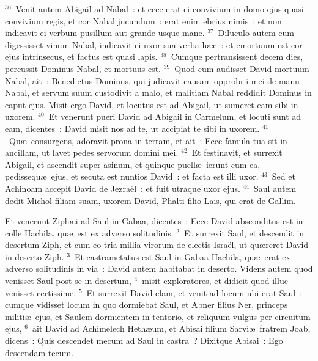 ${}^{36}$~Venit autem Abigail ad Nabal~: et ecce erat ei convivium in domo ejus quasi convivium regis, et cor Nabal jucundum~: erat enim ebrius nimis~: et non indicavit ei verbum pusillum aut grande usque mane.
${}^{37}$~Diluculo autem cum digessisset vinum Nabal, indicavit ei uxor sua verba h\ae c~: et emortuum est cor ejus intrinsecus, et factus est quasi lapis.
${}^{38}$~Cumque pertransissent decem dies, percussit Dominus Nabal, et mortuus est.
${}^{39}$~Quod cum audisset David mortuum Nabal, ait~: Benedictus Dominus, qui judicavit causam opprobrii mei de manu Nabal, et servum suum custodivit a malo, et malitiam Nabal reddidit Dominus in caput ejus. Misit ergo David, et locutus est ad Abigail, ut sumeret eam sibi in uxorem.
${}^{40}$~Et venerunt pueri David ad Abigail in Carmelum, et locuti sunt ad eam, dicentes~: David misit nos ad te, ut accipiat te sibi in uxorem.
${}^{41}$~Qu\ae\ consurgens, adoravit prona in terram, et ait~: Ecce famula tua sit in ancillam, ut lavet pedes servorum domini mei.
${}^{42}$~Et festinavit, et surrexit Abigail, et ascendit super asinum, et quinque puell\ae\ ierunt cum ea, pedissequ\ae\ ejus, et secuta est nuntios David~: et facta est illi uxor.
${}^{43}$~Sed et Achinoam accepit David de Jezra\"el~: et fuit utraque uxor ejus.
${}^{44}$~Saul autem dedit Michol filiam suam, uxorem David, Phalti filio Lais, qui erat de Gallim.

\lettrine[lines=10,image=true,loversize=0.05,lraise=-0.03]{E}{}t venerunt Ziph\ae i ad Saul in Gabaa, dicentes~: Ecce David absconditus est in colle Hachila, qu\ae\ est ex adverso solitudinis.
${}^{2}$~Et surrexit Saul, et descendit in desertum Ziph, et cum eo tria millia virorum de electis Isra\"el, ut qu\ae reret David in deserto Ziph.
${}^{3}$~Et castrametatus est Saul in Gabaa Hachila, qu\ae\ erat ex adverso solitudinis in via~: David autem habitabat in deserto. Videns autem quod venisset Saul post se in desertum,
${}^{4}$~misit exploratores, et didicit quod illuc venisset certissime.
${}^{5}$~Et surrexit David clam, et venit ad locum ubi erat Saul~: cumque vidisset locum in quo dormiebat Saul, et Abner filius Ner, princeps militi\ae\ ejus, et Saulem dormientem in tentorio, et reliquum vulgus per circuitum ejus,
${}^{6}$~ait David ad Achimelech Heth\ae um, et Abisai filium Sarvi\ae\ fratrem Joab, dicens~: Quis descendet mecum ad Saul in castra~? Dixitque Abisai~: Ego descendam tecum.


